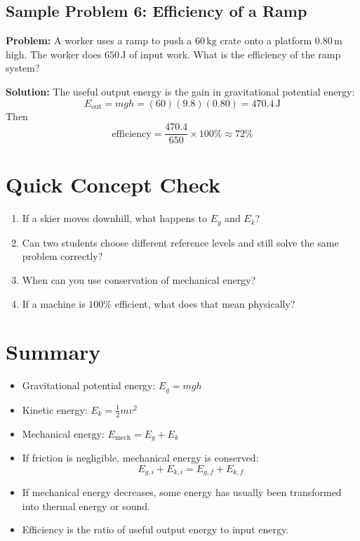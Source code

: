 \subsection*{Sample Problem 6: Efficiency of a Ramp}
\textbf{Problem:} A worker uses a ramp to push a $60\,\text{kg}$ crate onto a platform $0.80\,\text{m}$ high. The worker does $650\,\text{J}$ of input work. What is the efficiency of the ramp system?

\textbf{Solution:}
The useful output energy is the gain in gravitational potential energy:
\begin{equation*}
    E_{\text{out}} = mgh = (60)(9.8)(0.80) = 470.4\,\text{J}
\end{equation*}
Then
\begin{equation*}
    \text{efficiency} = \frac{470.4}{650}\times 100\% \approx 72\%
\end{equation*}

\section{Quick Concept Check}
\begin{enumerate}
    \item If a skier moves downhill, what happens to $E_g$ and $E_k$?
    \item Can two students choose different reference levels and still solve the same problem correctly?
    \item When can you use conservation of mechanical energy?
    \item If a machine is $100\%$ efficient, what does that mean physically?
\end{enumerate}

\section{Summary}
\begin{itemize}
    \item Gravitational potential energy: $E_g = mgh$
    \item Kinetic energy: $E_k = \frac{1}{2}mv^2$
    \item Mechanical energy: $E_{\text{mech}} = E_g + E_k$
    \item If friction is negligible, mechanical energy is conserved:
    \begin{equation*}
        E_{g,i} + E_{k,i} = E_{g,f} + E_{k,f}
    \end{equation*}
    \item If mechanical energy decreases, some energy has usually been transformed into thermal energy or sound.
    \item Efficiency is the ratio of useful output energy to input energy.
\end{itemize}


